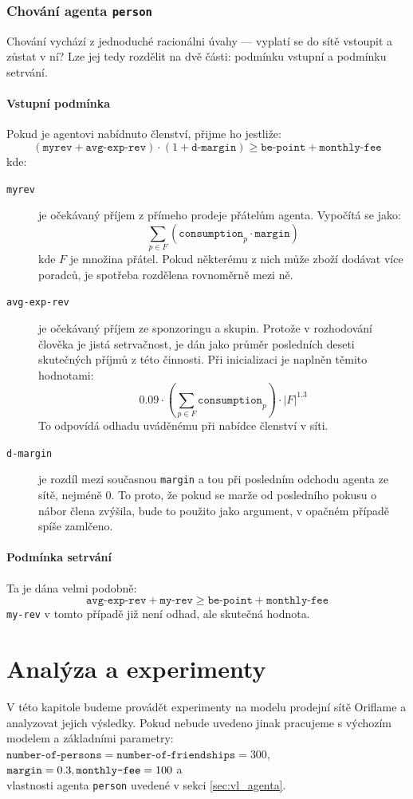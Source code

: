 \documentclass[a4wide,12pt]{report}
\begin{document}
\subsection{Chování agenta \texttt{person}}
Chování vychází z jednoduché racionálni úvahy --- vyplatí se do sítě vstoupit a zůstat v ní? Lze jej tedy rozdělit na dvě části: podmínku vstupní a podmínku setrvání.
\subsubsection{Vstupní podmínka}
Pokud je agentovi nabídnuto členství, přijme ho jestliže:
$$(\texttt{myrev} + \texttt{avg-exp-rev}) \cdot (1+\texttt{d-margin}) \geq \texttt{be-point} + \texttt{monthly-fee}$$
kde:
\begin{description}
\item[\texttt{myrev}] je očekávaný příjem z přímeho prodeje přátelům agenta. Vypočítá se jako: $$\sum_{p\in F}(\texttt{consumption}_p\cdot\texttt{margin})$$
kde $F$ je množina přátel. Pokud některému z nich může zboží dodávat více poradců, je spotřeba rozdělena rovnoměrně mezi ně.
\item[\texttt{avg-exp-rev}] je očekávaný příjem ze sponzoringu a skupin. Protože v rozhodování člověka je jistá setrvačnost, je dán jako průměr posledních deseti skutečných příjmů z této činnosti. Při inicializaci je naplněn těmito hodnotami:
\[ 0.09\cdot (\sum_{p\in F}\texttt{consumption}_p)\cdot |F|^{1.3} \]
To odpovídá odhadu uváděnému při nabídce členství v síti.
\item[\texttt{d-margin}] je rozdíl mezi současnou \texttt{margin} a tou při posledním odchodu agenta ze sítě, nejméně 0. To proto, že pokud se marže od posledního pokusu o nábor člena zvýšila, bude to použito jako argument, v opačném případě spíše zamlčeno.
\end{description}
\subsubsection{Podmínka setrvání}
Ta je dána velmi podobně:
\[ \texttt{avg-exp-rev} + \texttt{my-rev} \geq \texttt{be-point} + \texttt{monthly-fee} \]
\texttt{my-rev} v tomto případě již není odhad, ale skutečná hodnota.
%
\chapter{Analýza a experimenty}
V této kapitole budeme provádět experimenty na modelu prodejní sítě Oriflame a analyzovat jejich výsledky. Pokud nebude uvedeno jinak pracujeme s výchozím modelem a základními parametry:\\
$\texttt{number-of-persons}=\texttt{number-of-friendships}=300$, \\
$\texttt{margin}=0.3,\\\texttt{monthly-fee}=100$ a\\
vlastnosti agenta \texttt{person} uvedené v sekci \ref{sec:vl_agenta}.
\end{document}
